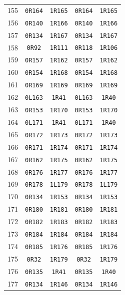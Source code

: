 \begin{longtable}{rcccc}
155 & \texttt{0R164} & \texttt{1R165} & \texttt{0R164} & \texttt{1R165} \\
156 & \texttt{0R140} & \texttt{1R166} & \texttt{0R140} & \texttt{1R166} \\
157 & \texttt{0R134} & \texttt{1R167} & \texttt{0R134} & \texttt{1R167} \\
158 & \texttt{0R92} & \texttt{1R111} & \texttt{0R118} & \texttt{1R106} \\
159 & \texttt{0R157} & \texttt{1R162} & \texttt{0R157} & \texttt{1R162} \\
160 & \texttt{0R154} & \texttt{1R168} & \texttt{0R154} & \texttt{1R168} \\
161 & \texttt{0R169} & \texttt{1R169} & \texttt{0R169} & \texttt{1R169} \\
162 & \texttt{0L163} & \texttt{1R41} & \texttt{0L163} & \texttt{1R40} \\
163 & \texttt{0R153} & \texttt{1R170} & \texttt{0R153} & \texttt{1R170} \\
164 & \texttt{0L171} & \texttt{1R41} & \texttt{0L171} & \texttt{1R40} \\
165 & \texttt{0R172} & \texttt{1R173} & \texttt{0R172} & \texttt{1R173} \\
166 & \texttt{0R171} & \texttt{1R174} & \texttt{0R171} & \texttt{1R174} \\
167 & \texttt{0R162} & \texttt{1R175} & \texttt{0R162} & \texttt{1R175} \\
168 & \texttt{0R176} & \texttt{1R177} & \texttt{0R176} & \texttt{1R177} \\
169 & \texttt{0R178} & \texttt{1L179} & \texttt{0R178} & \texttt{1L179} \\
170 & \texttt{0R134} & \texttt{1R153} & \texttt{0R134} & \texttt{1R153} \\
171 & \texttt{0R180} & \texttt{1R181} & \texttt{0R180} & \texttt{1R181} \\
172 & \texttt{0R182} & \texttt{1R183} & \texttt{0R182} & \texttt{1R183} \\
173 & \texttt{0R184} & \texttt{1R184} & \texttt{0R184} & \texttt{1R184} \\
174 & \texttt{0R185} & \texttt{1R176} & \texttt{0R185} & \texttt{1R176} \\
175 & \texttt{0R32} & \texttt{1R179} & \texttt{0R32} & \texttt{1R179} \\
176 & \texttt{0R135} & \texttt{1R41} & \texttt{0R135} & \texttt{1R40} \\
177 & \texttt{0R134} & \texttt{1R146} & \texttt{0R134} & \texttt{1R146} \\

\end{longtable}
